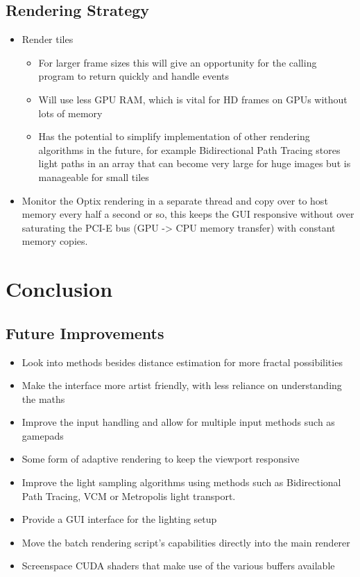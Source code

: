 \documentclass[11pt,a4paper,final,notitlepage]{report}
\begin{document}
\section{Rendering Strategy}
\begin{itemize}
	\item Render tiles
	\begin{itemize}
		\item For larger frame sizes this will give an opportunity for the calling program to return quickly and handle events
		\item Will use less GPU RAM, which is vital for HD frames on GPUs without lots of memory
		\item Has the potential to simplify implementation of other rendering algorithms in the future, for example Bidirectional Path Tracing stores light paths in an array that can become very large for huge images but is manageable for small tiles
	\end{itemize}

	\item Monitor the Optix rendering in a separate thread and copy over to host memory every half a second or so, this keeps the GUI responsive without over saturating the PCI-E bus (GPU -> CPU memory transfer) with constant memory copies.
	
\end{itemize}


\chapter{Conclusion}
\section{Future Improvements}

\begin{itemize}
	\item Look into methods besides distance estimation for more fractal possibilities
	\item Make the interface more artist friendly, with less reliance on understanding the maths
	\item Improve the input handling and allow for multiple input methods such as gamepads
	\item Some form of adaptive rendering to keep the viewport responsive
	\item Improve the light sampling algorithms using methods such as Bidirectional Path Tracing, VCM or Metropolis light transport.
	\item Provide a GUI interface for the lighting setup
	\item Move the batch rendering script's capabilities directly into the main renderer
	\item Screenspace CUDA shaders that make use of the various buffers available
	
\end{itemize}

\nocite{*}



\end{document}
